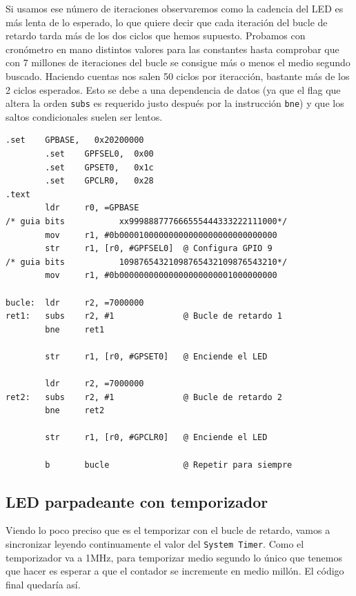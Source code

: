 Si usamos ese número de iteraciones observaremos como la cadencia del
LED es más lenta de lo esperado, lo que quiere decir que cada iteración del bucle
de retardo tarda más de los dos ciclos que hemos supuesto.
Probamos con cronómetro en mano distintos valores para las constantes hasta comprobar que con
7 millones de iteraciones del bucle se consigue más o menos el medio segundo buscado. Haciendo
cuentas nos salen 50 ciclos por iteracción, bastante más de los 2 ciclos esperados. Esto se
debe a una dependencia de datos (ya que el flag que altera
la orden {\tt subs} es requerido justo después por la instrucción {\tt bne}) y que los saltos
condicionales suelen ser lentos.


\begin{lstlisting}[caption={Parte de esbn4.s},label={lst:codigoPract4_4}]
        .set    GPBASE,   0x20200000
        .set    GPFSEL0,  0x00
        .set    GPSET0,   0x1c
        .set    GPCLR0,   0x28
.text
        ldr     r0, =GPBASE
/* guia bits           xx999888777666555444333222111000*/
        mov     r1, #0b00001000000000000000000000000000
        str     r1, [r0, #GPFSEL0]  @ Configura GPIO 9
/* guia bits           10987654321098765432109876543210*/
        mov     r1, #0b00000000000000000000001000000000

bucle:  ldr     r2, =7000000
ret1:   subs    r2, #1              @ Bucle de retardo 1
        bne     ret1

        str     r1, [r0, #GPSET0]   @ Enciende el LED

        ldr     r2, =7000000
ret2:   subs    r2, #1              @ Bucle de retardo 2
        bne     ret2

        str     r1, [r0, #GPCLR0]   @ Enciende el LED

        b       bucle               @ Repetir para siempre
\end{lstlisting}

\subsection{LED parpadeante con temporizador}

Viendo lo poco preciso que es el temporizar con el bucle de retardo, vamos a sincronizar leyendo
continuamente el valor del {\tt System Timer}. Como el temporizador va a 1MHz, para temporizar
medio segundo lo único que tenemos que hacer es esperar a que el contador se incremente en
medio millón. El código final quedaría así.

